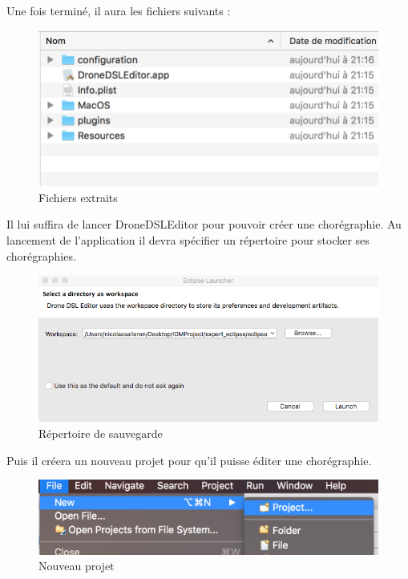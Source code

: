 \documentclass[12pt]{article}
\begin{document}
        Une fois terminé, il aura les fichiers suivants :
        
        \begin{figure}[!h]
        \centering
        \includegraphics[scale=0.75]{02.png}
        \caption{Fichiers extraits}
        \end{figure}
        
        Il lui suffira de lancer DroneDSLEditor pour pouvoir créer une chorégraphie.
        Au lancement de l'application il devra spécifier un répertoire pour stocker ses chorégraphies.
        
        \begin{figure}[!h]
        \centering
        \includegraphics[scale=0.50]{03.png}
        \caption{Répertoire de sauvegarde}
        \end{figure}
        
        \newpage
        Puis il créera un nouveau projet pour qu'il puisse éditer une chorégraphie.
        
        \begin{figure}[!h]
        \centering
        \includegraphics[scale=0.40]{04.png}
        \caption{Nouveau projet}
        \end{figure}
    
\end{document}
